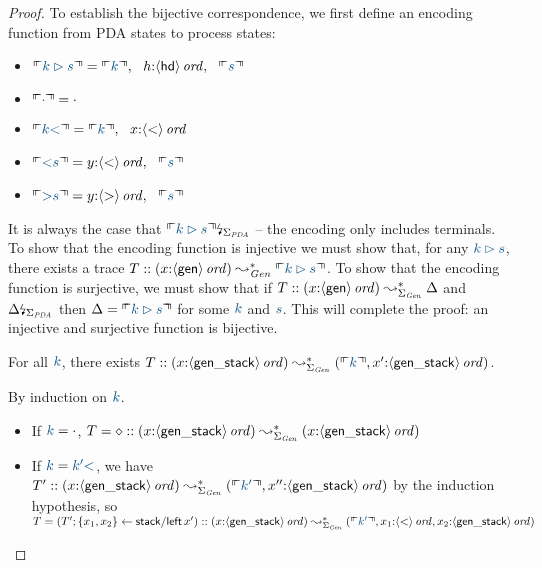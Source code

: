 \begin{proof}To establish the bijective correspondence, we first define
an encoding function from PDA states to process states:
\smallskip
\begin{itemize}
\item $\ctxinterp{k \rhd s} = 
  \ctxinterp{k}, ~~
  h{:}\istrue{\susp{\sf hd}}, ~~
  \ctxinterp{s}$
\item $\ctxinterp{\cdot} = \cdot$
\item $\ctxinterp{k{\sf <}} = \ctxinterp{k}, ~~ x{:}\istrue{\susp{\sf <}}$
\item $\ctxinterp{{\sf <}s} = y{:}\istrue{\susp{\sf <}}, ~~ \ctxinterp{s}$
\item $\ctxinterp{{\sf >}s} = y{:}\istrue{\susp{\sf >}}, ~~ \ctxinterp{s}$
\end{itemize}
\smallskip It is always the case that $\restrictsig{\ctxinterp{k \rhd
    s}}{\Sigma_{\it PDA}}$ -- the encoding only includes terminals.
To show that the encoding function is injective we must show that, for
any $\obj{k \rhd s}$, there exists a trace $T ::
(x{:}\istrue{\susp{\sf gen}}) \leadsto^*_{\it Gen} \ctxinterp{k \rhd
  s}$. To show that the encoding function is surjective, we must show
that if $T :: (x{:}{\langle {\sf gen} \rangle}\,{{\it ord}}) \leadsto^*_{\Sigma_{\it
    Gen}} \Delta$ and ${\Delta}{\mbox{\lightning}}_{\Sigma_{\it PDA}}$ then
$\Delta = \ctxinterp{k \rhd s}$ for some $\obj{k}$ and $\obj{s}$. This
will complete the proof: an injective and surjective function is
bijective.


\begin{lemma} For all $\obj{k}$, there exists
$T :: ({x{:}\istrue{\susp{\sf gen\_stack}}}) \leadsto^*_{\Sigma_{\it Gen}} 
({\ctxinterp{k}, x'{:}\istrue{\susp{\sf gen\_stack}}})$.
\end{lemma}
\noindent
By induction on $\obj{k}$. 
\begin{itemize}
\item If $\obj{k} = \cdot$, $T = \diamond ::
({x{:}{\langle {\sf gen\_stack} \rangle}\,{{\it ord}}}) \leadsto^*_{\Sigma_{\it Gen}} 
(x{:}{\langle {\sf gen\_stack} \rangle}\,{{\it ord}})$
\item If $\obj{k} = \obj{k' {\sf <}}$, we have 
$T' :: ({x{:}\istrue{\susp{\sf gen\_stack}}}) \leadsto^*_{\Sigma_{\it Gen}} 
({\ctxinterp{k'}, x''{:}\istrue{\susp{\sf gen\_stack}}})$ by the induction
hypothesis, so $T = (T'; \trstep{x_1, x_2}{{\sf stack/left}\,x'}) :: 
({x{:}\istrue{\susp{\sf gen\_stack}}}) \leadsto^*_{\Sigma_{\it Gen}} 
({\ctxinterp{k'}, x_1{:}\istrue{\susp{\sf <}}, x_2{:}\istrue{\susp{\sf gen\_stack}}})$
\end{itemize}


\end{proof}
